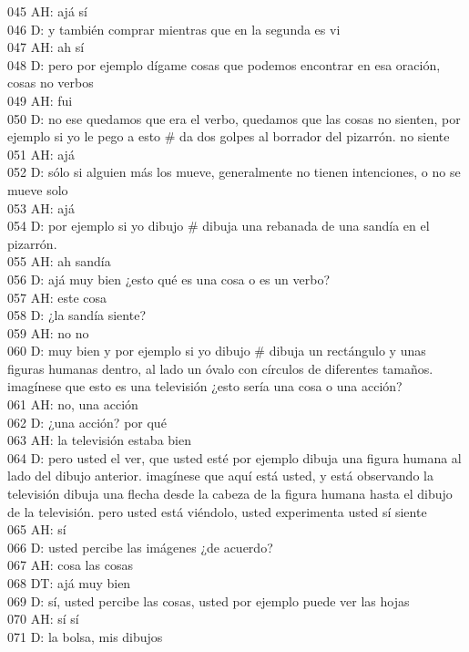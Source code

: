 045 AH: ajá sí\\
046 D: y también comprar mientras que en la segunda es vi\\
047 AH: ah sí\\
048 D: pero por ejemplo dígame cosas que podemos encontrar en esa oración, cosas no verbos\\
049 AH: fui\\
050 D: no ese quedamos que era el verbo, quedamos que las cosas no sienten, por ejemplo si yo le pego a esto \# da dos golpes al borrador del pizarrón. no siente\\
051 AH: ajá\\
052 D: sólo si alguien más los mueve, generalmente no tienen intenciones, o no se mueve solo\\
053 AH: ajá\\
054 D: por ejemplo si yo dibujo \# dibuja una rebanada de una sandía en el pizarrón.\\
055 AH: ah sandía\\
056 D: ajá muy bien ¿esto qué es una cosa o es un verbo?\\
057 AH: este cosa\\
058 D: ¿la sandía siente?\\
059 AH: no no\\
060 D: muy bien y por ejemplo si yo dibujo \# dibuja un rectángulo y unas figuras humanas dentro, al lado un óvalo con círculos de diferentes tamaños. imagínese que esto es una televisión ¿esto sería una cosa o una acción?\\
061 AH: no, una acción\\
062 D: ¿una acción? por qué\\
063 AH: la televisión estaba bien\\
064 D: pero usted el ver, que usted esté por ejemplo  dibuja una figura humana al lado del dibujo anterior. imagínese que aquí está usted, y está observando la televisión  dibuja una flecha desde la cabeza de la figura humana hasta el dibujo de la televisión. pero usted está viéndolo, usted experimenta usted sí siente\\
065 AH: sí\\
066 D: usted percibe las imágenes ¿de acuerdo?\\
067 AH: cosa las cosas\\
068 DT: ajá muy bien\\
069 D: sí, usted percibe las cosas, usted por ejemplo puede ver las hojas\\
070 AH: sí sí\\
071 D: la bolsa, mis dibujos\\
